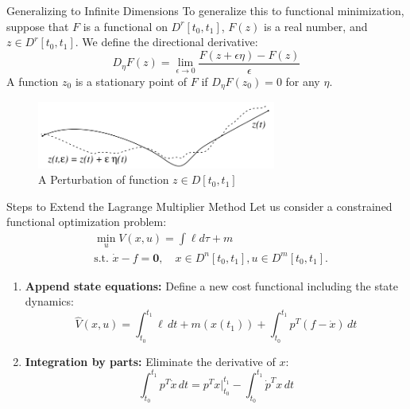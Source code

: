 \documentclass[10pt]{beamer}
\begin{document}
\begin{frame}{Generalizing to Infinite Dimensions}
  To generalize this to functional minimization, suppose that $F$ is a functional on $D^{r}[t_0,t_1]$, $F(z)$ is a real number, and $z \in D^{r}[t_0,t_1]$.
  We define the directional derivative:
  \[
    D_\eta F(z) = \lim_{\epsilon \to 0} \frac{F(z + \epsilon \eta) - F(z)}{\epsilon}
  \]
  A function \( z_0 \) is a stationary point of \( F \) if \( D_\eta F(z_0) = 0 \) for any \( \eta \).
  \begin{figure}
    \centering
    \includegraphics[width=0.7\textwidth]{photos/2.png}
    \caption{A Perturbation of function \(z\in D[t_{0},t_{1}]\)}
  \end{figure}
\end{frame}

\begin{frame}{Steps to Extend the Lagrange Multiplier Method}
  Let us consider a constrained functional optimization problem:
  \[
    \begin{aligned}
      &\min_u V(x,u)=\int \ell d \tau + m \\
      &\text{s.t. } \dot{x}-f=\mathbf{0}, \quad x\in D^{n}[t_{0},t_{1}], u \in D^{m}[t_{0},t_{1}].
    \end{aligned}
  \]
  \begin{enumerate}
      \item \textbf{Append state equations:} Define a new cost functional including the state dynamics:
      \[
      \hat{V}(x, u) = \int_{t_0}^{t_1} \ell \, dt + m(x(t_1)) + \int_{t_0}^{t_1} p^T (f - \dot{x}) \, dt
      \]
      \item \textbf{Integration by parts:} Eliminate the derivative of \( x \):
      \[
      \int_{t_0}^{t_1} p^T \dot{x} \, dt = p^T x |_{t_0}^{t_1} - \int_{t_0}^{t_1} \dot{p}^T x \, dt
      \]
  \end{enumerate}
\end{frame}
\end{document}
